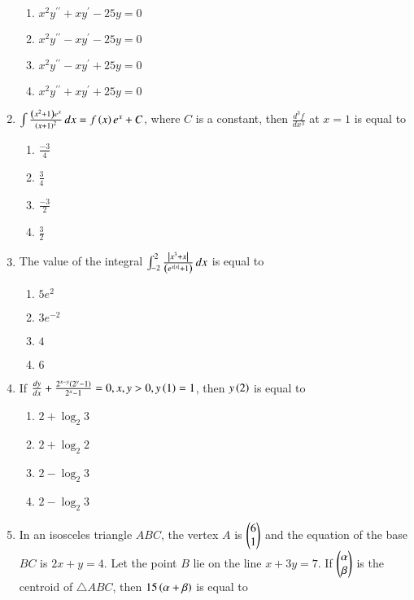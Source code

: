 \documentclass[journal,onecolumn]{IEEEtran}
\theoremstyle{remark}
\begin{document}
\begin{enumerate}
	\begin{enumerate}
		\item $x^2y^{\prime\prime} + xy^{\prime} - 25y = 0$ 
		\item $x^2y^{\prime\prime} - xy^{\prime} - 25y = 0$ 
		\item $x^2y^{\prime\prime} - xy^{\prime} + 25y = 0$ 
		\item $x^2y^{\prime\prime} + xy^{\prime} + 25y = 0$ 
	\end{enumerate}

    \item $\int \frac{\left(x^2 + 1\right)e^x}{\left(x+1\right)^2} \, dx = f\left(x\right)e^x + C$, where $C$ is a constant, then $\frac{d^3f}{dx^3}$ at $x = 1$ is equal to

	\begin{enumerate}
		\item $\frac{-3}{4}$
		\item $\frac{3}{4}$
		\item $\frac{-3}{2}$
		\item $\frac{3}{2}$
	\end{enumerate}

    \item The value of the integral $\int_{-2}^{2} \frac{\left\vert x^3 + x\right\vert}{\left(e^{x\left\vert x\right\vert} + 1\right)} \, dx$ is equal to

	\begin{enumerate}
		\item $5e^2$ 
		\item $3e^{-2}$
		\item $4$
		\item $6$
	\end{enumerate}

    \item If $\frac{dy}{dx} + \frac{2^{x - y}\left(2^y - 1\right)}{2^x - 1} = 0, x,y > 0, y\left(1\right) = 1$, then $y\left(2\right)$ is equal to

	\begin{enumerate}
		\item $2 + \log_{2} 3$ 
		\item $2 + \log_{2} 2$ 
		\item $2 - \log_{2} 3$ 
		\item $2 - \log_{2} 3$ 
	\end{enumerate}

    \item In an isosceles triangle $ABC$, the vertex $A$ is $\begin{pmatrix}6\\1\end{pmatrix}$ and the equation of the base $BC$ is $2x + y = 4$. Let the point $B$ lie on the line $x + 3y = 7$. If $\begin{pmatrix}\alpha\\\beta\end{pmatrix}$ is the centroid of $\triangle ABC$, then $15\left(\alpha + \beta\right)$ is equal to


\end{enumerate}
\end{document}
